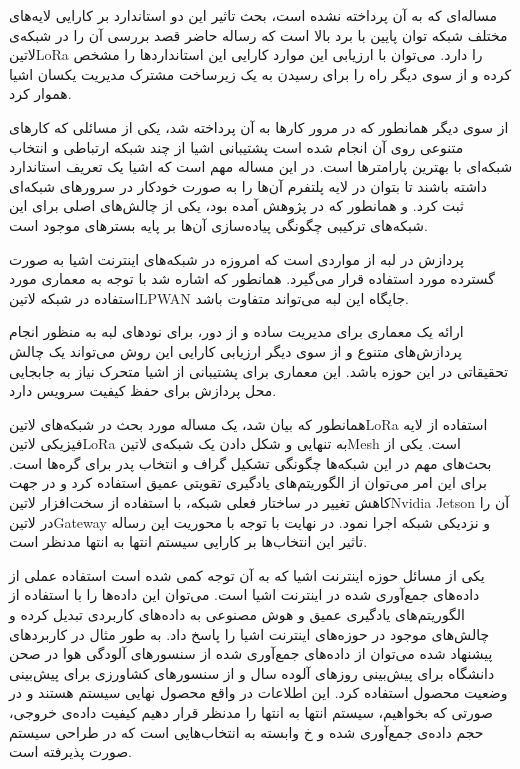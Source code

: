 مساله‌ای که به آن پرداخته نشده است، بحث تاثیر این دو استاندارد بر کارایی لایه‌های مختلف شبکه توان پایین با برد بالا است که رساله حاضر قصد بررسی آن را در شبکه‌ی ‌لاتین{LoRa} را دارد.
می‌توان با ارزیابی این موارد کارایی این استانداردها را مشخص کرده و از سوی دیگر راه را برای رسیدن به یک زیرساخت مشترک مدیریت یکسان اشیا هموار کرد.

از سوی دیگر همانطور که در مرور کارها به آن پرداخته شد، یکی از مسائلی که کارهای متنوعی روی آن انجام شده است پشتیبانی اشیا از چند شبکه ارتباطی و انتخاب شبکه‌ای با بهترین
پارامترها است. در این مساله مهم است که اشیا یک تعریف استاندارد داشته باشند تا بتوان در لایه پلتفرم آن‌ها را به صورت خودکار در سرورهای شبکه‌ای ثبت کرد.
و همانطور که در پژوهش  آمده بود، یکی از چالش‌های اصلی برای این شبکه‌های ترکیبی چگونگی پیاده‌سازی آن‌ها بر پایه بسترهای موجود است.


پردازش در لبه از مواردی است که امروزه در شبکه‌های اینترنت اشیا به صورت گسترده مورد استفاده قرار می‌گیرد.
همانطور که اشاره شد با توجه به معماری مورد استفاده در شبکه ‌لاتین{LPWAN} جایگاه این لبه می‌تواند متفاوت باشد.

ارائه یک معماری برای مدیریت ساده و از دور، برای نودهای لبه به منظور انجام پردازش‌های متنوع و از سوی دیگر ارزیابی کارایی این روش می‌تواند یک چالش تحقیقاتی در این حوزه باشد.
این معماری برای پشتیبانی از اشیا متحرک نیاز به جابجایی محل پردازش برای حفظ کیفیت سرویس دارد.


همانطور که بیان شد، یک مساله مورد بحث در شبکه‌های ‌لاتین{LoRa} استفاده از لایه فیزیکی ‌لاتین{LoRa} به تنهایی و شکل دادن یک شبکه‌ی ‌لاتین{Mesh} است.
یکی از بحث‌های مهم در این شبکه‌ها چگونگی تشکیل گراف و انتخاب پدر برای گره‌ها است. برای این امر می‌توان از الگوریتم‌های یادگیری تقویتی عمیق استفاده کرد
و در جهت کاهش تغییر در ساختار فعلی شبکه، با استفاده از سخت‌افزار ‌لاتین{Nvidia Jetson} آن را در ‌لاتین{Gateway} و نزدیکی شبکه اجرا نمود.
در نهایت با توجه با محوریت این رساله تاثیر این انتخاب‌ها بر کارایی سیستم انتها به انتها مدنظر است.


یکی از مسائل حوزه اینترنت اشیا که به آن توجه کمی شده است استفاده عملی از داده‌های جمع‌آوری شده در اینترنت اشیا است. می‌توان این داده‌ها را با استفاده از الگوریتم‌های یادگیری عمیق و هوش مصنوعی به داده‌های کاربردی تبدیل کرده
و چالش‌های موجود در حوزه‌های اینترنت اشیا را پاسخ داد. به طور مثال در کاربردهای پیشنهاد شده می‌توان از داده‌های جمع‌آوری شده از سنسورهای آلودگی هوا در صحن دانشگاه برای پیش‌بینی روزهای آلوده سال و از سنسورهای کشاورزی
برای پیش‌بینی وضعیت محصول استفاده کرد.
این اطلاعات در واقع محصول نهایی سیستم هستند و در صورتی که بخواهیم، سیستم انتها به انتها را مدنظر قرار دهیم کیفیت داده‌ی خروجی، حجم داده‌ی جمع‌آوری شده و ‌خ وابسته به انتخاب‌هایی است که در طراحی سیستم صورت پذیرفته است.

